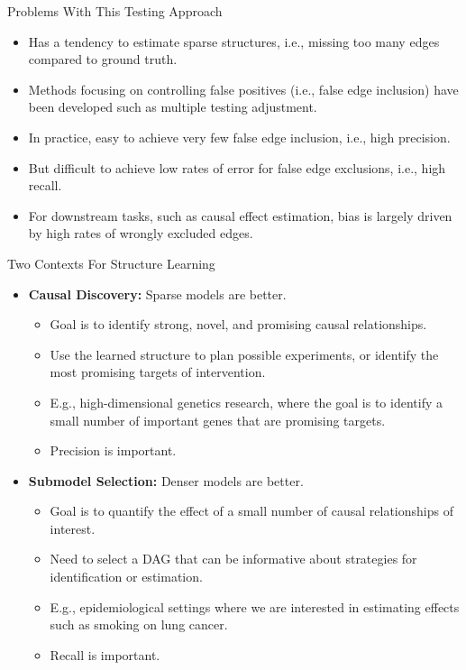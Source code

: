 \documentclass{beamer}
\begin{document}
\begin{frame}{Problems With This Testing Approach}
	\begin{itemize}
		\item Has a tendency to estimate sparse structures, i.e., missing too many edges compared to ground truth.
		\item Methods focusing on controlling false positives (i.e., false edge inclusion) have been developed such as multiple testing adjustment.
		\item In practice, easy to achieve very few false edge inclusion, i.e., high precision.
		\item But difficult to achieve low rates of error for false edge exclusions, i.e., high recall.
		\item For downstream tasks, such as causal effect estimation, bias is largely driven by high rates of wrongly excluded edges.
	\end{itemize}
\end{frame}

\begin{frame}{Two Contexts For Structure Learning}
	\begin{itemize}
		\item \textbf{Causal Discovery:} Sparse models are better.
			\begin{itemize}
				\item Goal is to identify strong, novel, and promising causal relationships.
				\item Use the learned structure to plan possible experiments, or identify the most promising targets of intervention.
				\item E.g., high-dimensional genetics research, where the goal is to identify a small number of important genes that are promising targets.
				\item Precision is important.
			\end{itemize}
		\item \textbf{Submodel Selection:} Denser models are better.
			\begin{itemize}
				\item Goal is to quantify the effect of a small number of causal relationships of interest.
				\item Need to select a DAG that can be informative about strategies for identification or estimation.
				\item E.g., epidemiological settings where we are interested in estimating effects such as smoking on lung cancer.
				\item Recall is important.
			\end{itemize}
	\end{itemize}
\end{frame}
\end{document}
